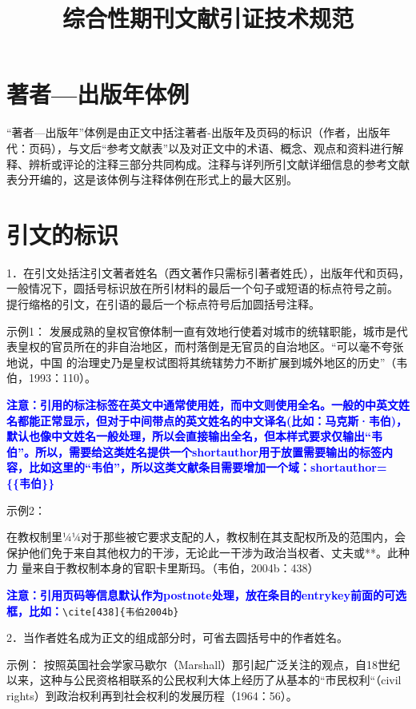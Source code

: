 \documentclass{article}
\newcommand{\qd}[1]{\textbf{\textcolor{blue}{#1}}}
\begin{document}
\title{综合性期刊文献引证技术规范}
\maketitle

\section{著者—出版年体例}

“著者—出版年”体例是由正文中括注著者-出版年及页码的标识（作者，出版年代：页码），与文后“参考文献表”以及对正文中的术语、概念、观点和资料进行解
释、辨析或评论的注释三部分共同构成。注释与详列所引文献详细信息的参考文献表分开编的，这是该体例与注释体例在形式上的最大区别。

\section{引文的标识}

1．在引文处括注引文著者姓名（西文著作只需标引著者姓氏），出版年代和页码，一般情况下，圆括号标识放在所引材料的最后一个句子或短语的标点符号之前。
提行缩格的引文，在引语的最后一个标点符号后加圆括号注释。

示例1：
发展成熟的皇权官僚体制一直有效地行使着对城市的统辖职能，城市是代表皇权的官员所在的非自治地区，而村落倒是无官员的自治地区。“可以毫不夸张地说，中国
的治理史乃是皇权试图将其统辖势力不断扩展到城外地区的历史”（韦伯，1993：110）。

\cite[110]{韦伯1993}
\qd{注意：引用的标注标签在英文中通常使用姓，而中文则使用全名。一般的中英文姓名都能正常显示，但对于中间带点的英文姓名的中文译名(比如：马克斯·韦伯)，默认也像中文姓名一般处理，所以会直接输出全名，但本样式要求仅输出“韦伯”。所以，需要给这类姓名提供一个shortauthor用于放置需要输出的标签内容，比如这里的“韦伯”，所以这类文献条目需要增加一个域：shortauthor=\{\{韦伯\}\}}

示例2：

在教权制里¼¼对于那些被它要求支配的人，教权制在其支配权所及的范围内，会保护他们免于来自其他权力的干涉，无论此一干涉为政治当权者、丈夫或**。此种力
量来自于教权制本身的官职卡里斯玛。（韦伯，2004b：438）

\cite[438]{韦伯2004b}\qd{注意：引用页码等信息默认作为postnote处理，放在条目的entrykey前面的可选框，比如：}\verb|\cite[438]{韦伯2004b}|


2．当作者姓名成为正文的组成部分时，可省去圆括号中的作者姓名。

示例：
按照英国社会学家马歇尔（Marshall）那引起广泛关注的观点，自18世纪以来，这种与公民资格相联系的公民权利大体上经历了从基本的“市民权利“（civil rights）到政治权利再到社会权利的发展历程（1964：56）。
\end{document}
